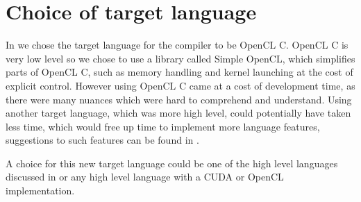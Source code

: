\section{Choice of target language}
In  we chose the target language for the compiler to be OpenCL C.
OpenCL C is very low level so we chose to use a library called Simple OpenCL, which simplifies parts of OpenCL C, such as memory handling and kernel launching at the cost of explicit control. 
However using OpenCL C came at a cost of development time, as there were many nuances which were hard to comprehend and understand. 
Using another target language, which was more high level, could potentially have taken less time,  which would free up time to implement more language features, suggestions to such features can be found in . 

A choice for this new target language could be one of the high level languages discussed in  or any high level language with a CUDA or OpenCL implementation.
